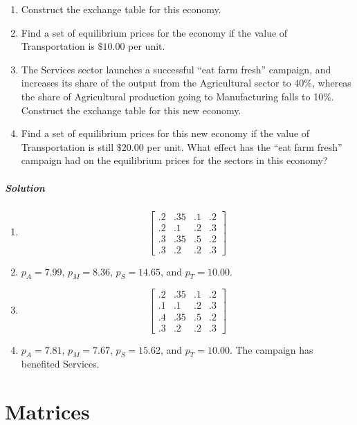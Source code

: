 \documentclass[oneside]{book} %
\theoremstyle{plain}
\begin{document}
\begin{enumerate}
\item Construct the exchange table for this economy.
\item Find a set of equilibrium prices for the economy if the value of
  Transportation is \(\$10.00\) per unit.
\item {The Services sector launches a successful ``eat farm fresh'' campaign,
       and increases its share of the output from the Agricultural sector to
40\%,
       whereas the share of Agricultural production going to Manufacturing falls
to 10\%.
       Construct the exchange table for this new economy.}
\item {Find a set of equilibrium prices for this new economy if the value of
    Transportation is still \(\$20.00\) per unit.
       What effect has the ``eat farm fresh'' campaign had on the equilibrium
prices for the sectors in this economy?}
\end{enumerate}

\subparagraph{Solution}

\begin{enumerate}
  \item {\[ \begin{bmatrix}
.2 & .35 & .1 & .2 \\
.2 &  .1 & .2 & .3 \\
.3 & .35 & .5 & .2 \\
    .3 &  .2 & .2 & .3 \end{bmatrix} \]}
        \item{\(p_A = 7.99\), \(p_M = 8.36\), \(p_S = 14.65\), and \(p_T = 10.00\).}
\item {\[ \begin{bmatrix}
.2 & .35 & .1 & .2 \\
.1 &  .1 & .2 & .3 \\
.4 & .35 & .5 & .2 \\
  .3 &  .2 & .2 & .3 \end{bmatrix} \]}
      \item{\(p_A = 7.81\), \(p_M = 7.67\), \(p_S = 15.62\), and \(p_T = 10.00\).
      The campaign has benefited Services.}
\end{enumerate}

\section{Matrices}
\end{document}

